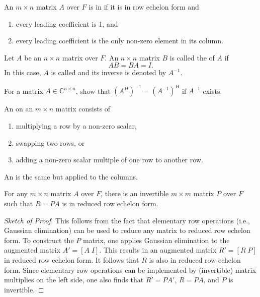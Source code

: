 \begin{definition}
An $m\times n$ matrix $A$ over $F$ is in  if it is in row echelon form and
\begin{enumerate}
\item every leading coefficient is 1, and
\item every leading coefficient is the only non-zero element in its column.
\end{enumerate}
\end{definition}

\begin{definition}
Let $A$ be an $n \times n$ matrix over $F$.
An $n \times n$ matrix $B$ is called the  of $A$ if
\begin{equation*}
AB = BA = I.
\end{equation*}
In this case, $A$ is called  and its inverse is denoted by $A^{-1}$.
\end{definition}

\begin{problem}
For a matrix $A\in \mathbb{C}^{n\times n}$, show that $(A^H)^{-1} = (A^{-1})^H$ if $A^{-1}$ exists.
\end{problem}

\begin{definition}
An  on an $m \times n$ matrix consists of
\begin{enumerate}
\item multiplying a row by a non-zero scalar,
\item swapping two rows, or
\item adding a non-zero scalar multiple of one row to another row.
\end{enumerate}
An  is the same but applied to the columns.
\end{definition}

\begin{lemma}
For any $m\times n$ matrix $A$ over $F$, there is an invertible $m \times m$ matrix $P$ over $F$ such that $R=PA$ is in reduced row echelon form.
\end{lemma}
\begin{proof}[Sketch of Proof]
This follows from the fact that elementary row operations (i.e., Gaussian elimination) can be used to reduce any matrix to reduced row echelon form.
To construct the $P$ matrix, one applies Gaussian elimination to the augmented matrix $A' = [A \; I]$.
This results in an augmented matrix $R' = [R\; P]$ in reduced row echelon form.
It follows that $R$ is also in reduced row echelon form.
Since elementary row operations can be implemented by (invertible) matrix multiplies on the left side, one also finds that $R' = P A'$, $R = PA$, and $P$ is invertible.
\end{proof}

